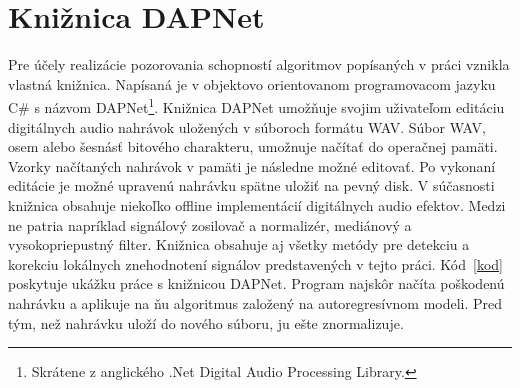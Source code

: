 
\chapter{Knižnica DAPNet}
Pre účely realizácie pozorovania schopností algoritmov popísaných v práci vznikla vlastná knižnica. Napísaná je v objektovo orientovanom programovacom jazyku C\# s názvom DAPNet\footnote{Skrátene z anglického .Net Digital Audio Processing Library.}. Knižnica DAPNet umožňuje svojim uživateľom editáciu digitálnych audio nahrávok uložených v súboroch formátu WAV. Súbor WAV, osem alebo šesnásť bitového charakteru, umožnuje načítať do operačnej pamäti. Vzorky načítaných nahrávok v pamäti je následne možné editovať. Po vykonaní editácie je možné upravenú nahrávku spätne uložiť na pevný disk. V súčasnosti knižnica obsahuje niekoľko offline implementácií digitálnych audio efektov. Medzi ne patria napríklad signálový zosilovač a normalizér, mediánový a vysokopriepustný filter. Knižnica obsahuje aj všetky metódy pre detekciu a korekciu lokálnych znehodnotení signálov predstavených v tejto práci. Kód~\ref{kod} poskytuje ukážku práce s knižnicou DAPNet. Program najskôr načíta poškodenú nahrávku a aplikuje na ňu algoritmus založený na autoregresívnom modeli. Pred tým, než nahrávku uloží do nového súboru, ju ešte znormalizuje.



